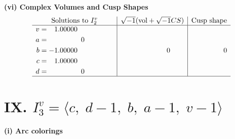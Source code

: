 \documentclass[1p]{elsarticle_modified}
\theoremstyle{definition}
\newcommand{\I}{\sqrt{-1}}
\begin{document}
\newpage\flushleft \textbf{(vi) Complex Volumes and Cusp Shapes}
$$\begin{array}{c|c|c}  
\text{Solutions to }I^v_{2}& \I (\text{vol} + \sqrt{-1}CS) & \text{Cusp shape}\\
 \hline 
\begin{aligned}
v &= \phantom{-}1.00000\phantom{ +0.000000I} \\
a &= \phantom{-0.000000 } 0 \\
b &= -1.00000\phantom{ +0.000000I} \\
c &= \phantom{-}1.00000\phantom{ +0.000000I} \\
d &= \phantom{-0.000000 } 0\end{aligned}
 & \phantom{-0.000000 } 0 & \phantom{-0.000000 } 0\\
 \hline 
 \end{array}$$\newpage\newpage\renewcommand{\arraystretch}{1}
\centering \section*{IX. $I^v_{3}= \langle c,\;d-1,\;b,\;a-1,\;v-1 \rangle$}
\flushleft \textbf{(i) Arc colorings}\\
\end{document}
